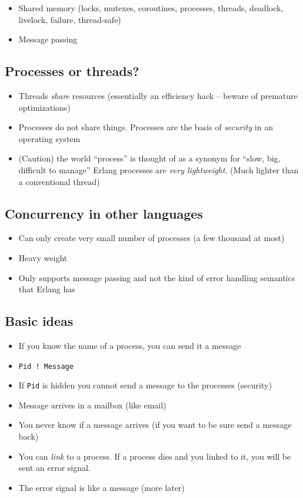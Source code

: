 \documentclass[12pt]{article}
\begin{document}
\begin{itemize}

\item Shared memory (locks, mutexes, coroutines, processes,
threads, deadlock, livelock, failure, thread-safe)

\item Message passing 
\end{itemize}

\subsection{Processes or threads?}
 
\begin{itemize}
\item Threads {\sl share} resources (essentially an efficiency hack -- beware
of premature optimizations)
\item Processes do not share things. Processes are the basis of {\sl security} in an operating system

\item (Caution) the world ``process'' is thought of as a synonym for
  ``slow, big, difficult to manage'' Erlang processes are {\sl very
  lightweight}. (Much lighter than a conventional thread)
\end{itemize}

\subsection{Concurrency in other languages}

\begin{itemize}
\item Can only create very small number of processes (a few thousand at most)
\item Heavy weight
\item Only supports message passing and not the kind of error handling semantics that
Erlang has
\end{itemize}

\subsection{Basic ideas}

\begin{itemize}
\item If you know the name of a process, you can send it a message
\item \verb+Pid ! Message+
\item If \verb+Pid+ is hidden you cannot send a message to the
  processes (security)
\item Message arrives in a mailbox (like email)
\item You never know if a message arrives (if you want to be sure send a message back)
\item You can {\sl link} to a process. If a process dies and you linked
to it, you will be sent an error signal.
\item The error signal is like a message (more later)
\end{itemize}
\end{document}

